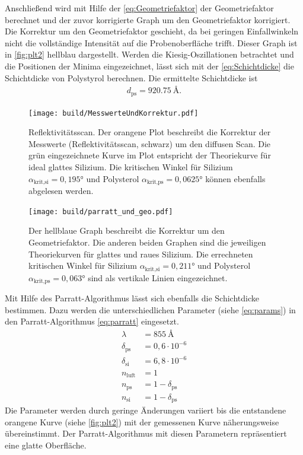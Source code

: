 Anschließend wird mit Hilfe der \autoref{eq:Geometriefaktor} der Geometriefaktor berechnet und der zuvor korrigierte Graph um den Geometriefaktor korrigiert. 
Die Korrektur um den Geometriefaktor geschieht, da bei geringen Einfallwinkeln nicht die vollständige Intensität auf die Probenoberfläche trifft. 
Dieser Graph ist in \autoref{fig:plt2} hellblau dargestellt. 
Werden die Kiesig-Oszillationen betrachtet und die Positionen der Minima eingezeichnet, lässt sich mit der \autoref{eq:Schichtdicke} die 
Schichtdicke von Polystyrol berechnen.
Die ermittelte Schichtdicke ist
\begin{align*}
    d_\text{ps} = \SI{920,75}{\angstrom}.
\end{align*}
\begin{figure}
    \centering                         
    \texttt{[image: build/MesswerteUndKorrektur.pdf]}
    \caption{Reflektivitätsscan. Der orangene Plot beschreibt die Korrektur der Messwerte (Reflektivitätsscan, schwarz) um den
    diffusen Scan. Die grün eingezeichnete Kurve im Plot entspricht der Theoriekurve für ideal glattes Silizium. 
    Die kritischen Winkel für Silizium $\alpha_\text{krit,si} = 0,195°$ und Polysterol $\alpha_\text{krit,ps} = 0,0625°$
     können ebenfalls abgelesen werden.}
    \label{fig:plt1}
\end{figure}
\FloatBarrier

\newpage
\begin{figure}
    \centering                         
    \texttt{[image: build/parratt\_und\_geo.pdf]}
    \caption{Der hellblaue Graph beschreibt die Korrektur um den Geometriefaktor. Die anderen beiden Graphen sind die jeweiligen 
    Theoriekurven für glattes und raues Silizium. Die errechneten kritischen Winkel für Silizium 
    $\alpha_\text{krit,si} = 0,211°$ und Polysterol $\alpha_\text{krit,ps} = 0,063°$ sind als vertikale Linien eingezeichnet. }
    \label{fig:plt2}
\end{figure}
\FloatBarrier
Mit Hilfe des Parratt-Algorithmus lässt sich ebenfalls die Schichtdicke bestimmen. 
Dazu werden die unterschiedlichen Parameter (siehe \autoref{eq:params}) in den Parratt-Algorithmus \autoref{eq:parratt} eingesetzt.
\begin{equation}\label{eq:params}    
    \begin{split}
        \lambda &= \SI{855}{\angstrom}\\
        \delta_\text{ps} &= 0,6\cdot 10^{-6}\\
        \delta_\text{si}&= 6,8\cdot 10^{-6} \\
        n_\text{luft} &= 1 \\
        n_\text{ps} &= 1 - \delta_\text{ps} \\
        n_\text{si} &= 1 - \delta_\text{ps} 
    \end{split}
\end{equation}
Die Parameter werden durch geringe Änderungen variiert bis die entstandene orangene Kurve (siehe \autoref{fig:plt2}) mit der gemessenen
Kurve näherungsweise übereinstimmt. 
Der Parratt-Algorithmus mit diesen Parametern repräsentiert eine glatte Oberfläche.

